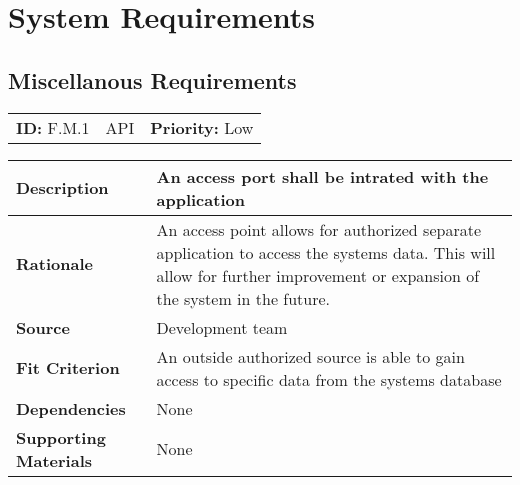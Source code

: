 
\section{System Requirements}


\subsection{Miscellanous Requirements}

\begin{table}[H]
    \begin{tabularx}{\textwidth}{| l | X | l |}
        \hline
        \textbf{ID:} F.M.1 & API & \textbf{Priority:} Low \\
    \end{tabularx}
    \begin{tabularx}{\textwidth}{| l | X |}
        \hline
        \textbf{Description} & An access port shall be intrated with the application \\ \hline
        \textbf{Rationale} & An access point allows for authorized separate application to access the systems data. This will allow for further improvement or expansion of the system in the future.\\ \hline
        \textbf{Source} &  Development team\\ \hline
        \textbf{Fit Criterion} & An outside authorized source is able to gain access to specific data from the systems database   \\ \hline
        \textbf{Dependencies} & None \\ \hline
        \textbf{Supporting Materials} & None \\ \hline
    \end{tabularx}
\end{table}

